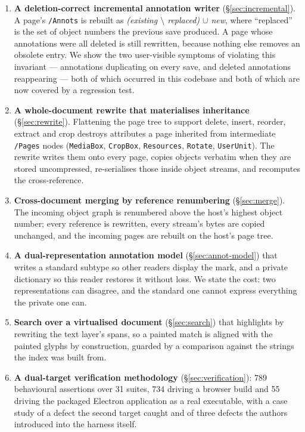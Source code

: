 \begin{enumerate}
  \item \textbf{A deletion-correct incremental annotation writer}
        (\S\ref{sec:incremental}). A page's \texttt{/Annots} is rebuilt as
        \emph{(existing $\setminus$ replaced) $\cup$ new}, where ``replaced'' is the set of
        object numbers the previous save produced. A page whose annotations were all deleted
        is still rewritten, because nothing else removes an obsolete entry. We show the two
        user-visible symptoms of violating this invariant --- annotations duplicating on every
        save, and deleted annotations reappearing --- both of which occurred in this codebase
        and both of which are now covered by a regression test.

  \item \textbf{A whole-document rewrite that materialises inheritance}
        (\S\ref{sec:rewrite}). Flattening the page tree to support delete, insert, reorder,
        extract and crop destroys attributes a page inherited from intermediate
        \texttt{/Pages} nodes (\texttt{MediaBox}, \texttt{CropBox}, \texttt{Resources},
        \texttt{Rotate}, \texttt{UserUnit}). The rewrite writes them onto every page, copies
        objects verbatim when they are stored uncompressed, re-serialises those inside object
        streams, and recomputes the cross-reference.

  \item \textbf{Cross-document merging by reference renumbering}
        (\S\ref{sec:merge}). The incoming object graph is renumbered above the host's highest
        object number; every reference is rewritten, every stream's bytes are copied
        unchanged, and the incoming pages are rebuilt on the host's page tree.

  \item \textbf{A dual-representation annotation model} (\S\ref{sec:annot-model}) that writes
        a standard subtype so other readers display the mark, and a private dictionary so this
        reader restores it without loss. We state the cost: two representations can disagree,
        and the standard one cannot express everything the private one can.

  \item \textbf{Search over a virtualised document} (\S\ref{sec:search}) that highlights by
        rewriting the text layer's spans, so a painted match is aligned with the painted
        glyphs by construction, guarded by a comparison against the strings the index was
        built from.

  \item \textbf{A dual-target verification methodology} (\S\ref{sec:verification}): 789
        behavioural assertions over 31 suites, 734 driving a browser build and 55 driving the
        packaged Electron application as a real executable, with a case study of a defect the
        second target caught and of three defects the authors introduced into the harness
        itself.
\end{enumerate}


